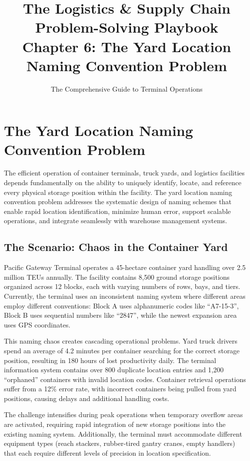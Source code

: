 \documentclass{article}
\title{The Logistics \& Supply Chain Problem-Solving Playbook\\
Chapter 6: The Yard Location Naming Convention Problem}
\author{The Comprehensive Guide to Terminal Operations}
\date{}
\begin{document}
\maketitle

\section{The Yard Location Naming Convention Problem}

The efficient operation of container terminals, truck yards, and logistics facilities depends fundamentally on the ability to uniquely identify, locate, and reference every physical storage position within the facility. The yard location naming convention problem addresses the systematic design of naming schemes that enable rapid location identification, minimize human error, support scalable operations, and integrate seamlessly with warehouse management systems.

\subsection{The Scenario: Chaos in the Container Yard}

Pacific Gateway Terminal operates a 45-hectare container yard handling over 2.5 million TEUs annually. The facility contains 8,500 ground storage positions organized across 12 blocks, each with varying numbers of rows, bays, and tiers. Currently, the terminal uses an inconsistent naming system where different areas employ different conventions: Block A uses alphanumeric codes like ``A7-15-3'', Block B uses sequential numbers like ``2847'', while the newest expansion area uses GPS coordinates.

This naming chaos creates cascading operational problems. Yard truck drivers spend an average of 4.2 minutes per container searching for the correct storage position, resulting in 180 hours of lost productivity daily. The terminal information system contains over 800 duplicate location entries and 1,200 ``orphaned'' containers with invalid location codes. Container retrieval operations suffer from a 12\% error rate, with incorrect containers being pulled from yard positions, causing delays and additional handling costs.

The challenge intensifies during peak operations when temporary overflow areas are activated, requiring rapid integration of new storage positions into the existing naming system. Additionally, the terminal must accommodate different equipment types (reach stackers, rubber-tired gantry cranes, empty handlers) that each require different levels of precision in location specification.
\end{document}
